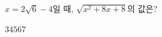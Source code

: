 $x=2\sqrt{6}-4$일 때, $\sqrt{x^2+8x+8}$의 값은?
\begin{choices32}{$3$}{$4$}{$5$}{$6$}{$7$}\end{choices32}

